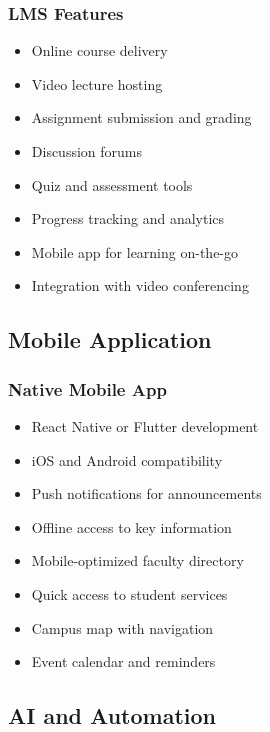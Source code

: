 \documentclass[12pt,a4paper]{report}
\begin{document}
\subsubsection*{LMS Features}
\begin{itemize}
    \item Online course delivery
    \item Video lecture hosting
    \item Assignment submission and grading
    \item Discussion forums
    \item Quiz and assessment tools
    \item Progress tracking and analytics
    \item Mobile app for learning on-the-go
    \item Integration with video conferencing
\end{itemize}

\subsection{Mobile Application}

\subsubsection*{Native Mobile App}
\begin{itemize}
    \item React Native or Flutter development
    \item iOS and Android compatibility
    \item Push notifications for announcements
    \item Offline access to key information
    \item Mobile-optimized faculty directory
    \item Quick access to student services
    \item Campus map with navigation
    \item Event calendar and reminders
\end{itemize}

\subsection{AI and Automation}
\end{document}
